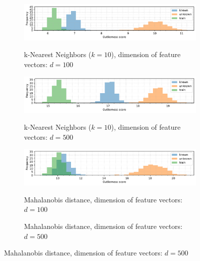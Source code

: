 \begin{figure}[t]
    \centering
    \begin{subfigure}[b]{\textwidth}
        \centering
        \caption{\small k-Nearest Neighbors ($k=10$), dimension of feature vectors: $d = 100$}
        \includegraphics[width=\textwidth]{images/distributions/hists-dimensions/hist-distributions-dimension_100-samples_1000-distance_8-distribution_uniform-model_kNN-10-seed_0.pdf}
        \label{fig:hists-knn-d100}
    \end{subfigure}
    \begin{subfigure}[b]{\textwidth}
        \centering
        \caption{\small k-Nearest Neighbors ($k=10$), dimension of feature vectors: $d = 500$}
        \includegraphics[width=\textwidth]{images/distributions/hists-dimensions/hist-distributions-dimension_500-samples_1000-distance_8-distribution_uniform-model_kNN-10-seed_0.pdf}
        \label{fig:hists-knn-d500}
    \end{subfigure}
    \begin{subfigure}[b]{\textwidth}
        \centering
        \caption{\small Mahalanobis distance, dimension of feature vectors: $d = 100$}
        \includegraphics[width=\textwidth]{images/distributions/hists-dimensions/hist-distributions-dimension_100-samples_1000-distance_8-distribution_uniform-model_MD-seed_0.pdf}
        \label{fig:hists-md-d100}
    \end{subfigure}
    \begin{subfigure}[b]{\textwidth}
        \centering
        \caption{\small Mahalanobis distance, dimension of feature vectors: $d = 500$}

\end{subfigure}
\end{figure}
